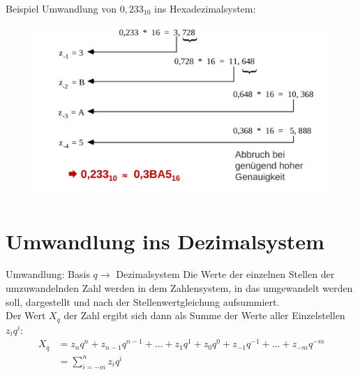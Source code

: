 \documentclass[12pt%
,aspectratio=169%
]{beamer}
\begin{document}
\begin{frame}{Beispiel}
Umwandlung von $0,233_{10}$ ins Hexadezimalsystem:
\begin{figure}
\center
\includegraphics[scale=0.3]{pictures/horner2.png}
\end{figure}
\end{frame}

\section{Umwandlung ins Dezimalsystem}

\begin{frame}{Umwandlung: Basis $q \to$ Dezimalsystem}
Die Werte der einzelnen Stellen der umzuwandelnden Zahl werden in dem Zahlensystem, in das umgewandelt werden soll, dargestellt und nach der Stellenwertgleichung aufsummiert.\\
Der Wert $X_q$ der Zahl ergibt sich dann als Summe der Werte aller Einzelstellen $z_i q^i$:
\begin{align*}
	X_q &= z_n q^n + z_{n -1} q^{n - 1} + \ldots + z_1 q^1 + z_0 q^0 + z_{-1} q^{-1} + \ldots + z_{-m} q^{-m}\\ 		&= \sum_{i=-m}^n z_i q^i
\end{align*}
\end{frame}
\end{document}
